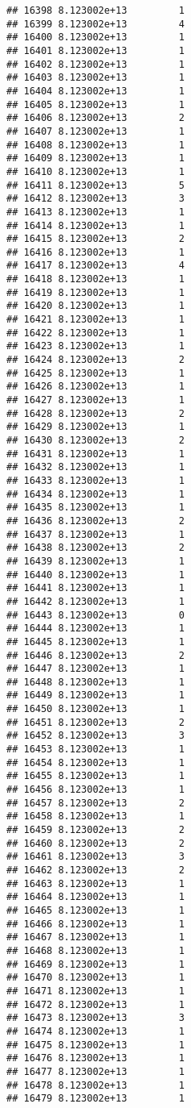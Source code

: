 \documentclass[
]{article}
\begin{document}
\begin{verbatim}
## 16398 8.123002e+13         1
## 16399 8.123002e+13         4
## 16400 8.123002e+13         1
## 16401 8.123002e+13         1
## 16402 8.123002e+13         1
## 16403 8.123002e+13         1
## 16404 8.123002e+13         1
## 16405 8.123002e+13         1
## 16406 8.123002e+13         2
## 16407 8.123002e+13         1
## 16408 8.123002e+13         1
## 16409 8.123002e+13         1
## 16410 8.123002e+13         1
## 16411 8.123002e+13         5
## 16412 8.123002e+13         3
## 16413 8.123002e+13         1
## 16414 8.123002e+13         1
## 16415 8.123002e+13         2
## 16416 8.123002e+13         1
## 16417 8.123002e+13         4
## 16418 8.123002e+13         1
## 16419 8.123002e+13         1
## 16420 8.123002e+13         1
## 16421 8.123002e+13         1
## 16422 8.123002e+13         1
## 16423 8.123002e+13         1
## 16424 8.123002e+13         2
## 16425 8.123002e+13         1
## 16426 8.123002e+13         1
## 16427 8.123002e+13         1
## 16428 8.123002e+13         2
## 16429 8.123002e+13         1
## 16430 8.123002e+13         2
## 16431 8.123002e+13         1
## 16432 8.123002e+13         1
## 16433 8.123002e+13         1
## 16434 8.123002e+13         1
## 16435 8.123002e+13         1
## 16436 8.123002e+13         2
## 16437 8.123002e+13         1
## 16438 8.123002e+13         2
## 16439 8.123002e+13         1
## 16440 8.123002e+13         1
## 16441 8.123002e+13         1
## 16442 8.123002e+13         1
## 16443 8.123002e+13         0
## 16444 8.123002e+13         1
## 16445 8.123002e+13         1
## 16446 8.123002e+13         2
## 16447 8.123002e+13         1
## 16448 8.123002e+13         1
## 16449 8.123002e+13         1
## 16450 8.123002e+13         1
## 16451 8.123002e+13         2
## 16452 8.123002e+13         3
## 16453 8.123002e+13         1
## 16454 8.123002e+13         1
## 16455 8.123002e+13         1
## 16456 8.123002e+13         1
## 16457 8.123002e+13         2
## 16458 8.123002e+13         1
## 16459 8.123002e+13         2
## 16460 8.123002e+13         2
## 16461 8.123002e+13         3
## 16462 8.123002e+13         2
## 16463 8.123002e+13         1
## 16464 8.123002e+13         1
## 16465 8.123002e+13         1
## 16466 8.123002e+13         1
## 16467 8.123002e+13         1
## 16468 8.123002e+13         1
## 16469 8.123002e+13         1
## 16470 8.123002e+13         1
## 16471 8.123002e+13         1
## 16472 8.123002e+13         1
## 16473 8.123002e+13         3
## 16474 8.123002e+13         1
## 16475 8.123002e+13         1
## 16476 8.123002e+13         1
## 16477 8.123002e+13         1
## 16478 8.123002e+13         1
## 16479 8.123002e+13         1

\end{verbatim}
\end{document}
